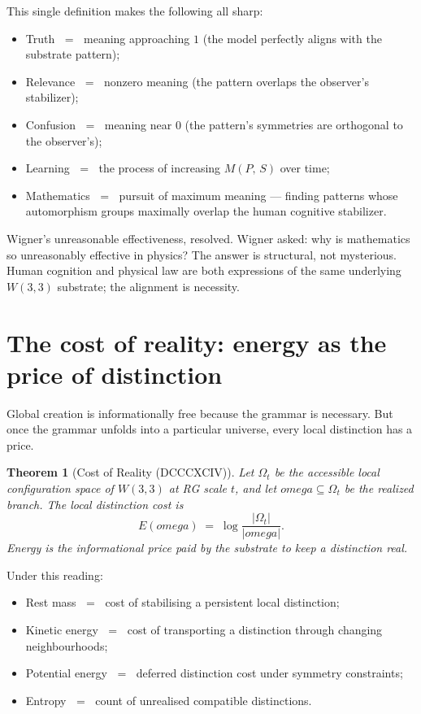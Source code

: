 \documentclass[11pt]{article}
\def\mathcal#1{#1}%
\def\textbf#1{#1}%
\def\omega{omega}%
\newtheorem*{theorem}{Theorem}
\begin{document}
This single definition makes the following all sharp:

\begin{itemize}[leftmargin=2em]
\item \textbf{Truth} $\;=\;$ meaning approaching $1$ (the model perfectly aligns with the substrate pattern);
\item \textbf{Relevance} $\;=\;$ nonzero meaning (the pattern overlaps the observer's stabilizer);
\item \textbf{Confusion} $\;=\;$ meaning near $0$ (the pattern's symmetries are orthogonal to the observer's);
\item \textbf{Learning} $\;=\;$ the process of increasing $\mathcal{M}(P,\,S)$ over time;
\item \textbf{Mathematics} $\;=\;$ pursuit of maximum meaning --- finding patterns whose automorphism groups maximally overlap the human cognitive stabilizer.
\end{itemize}

\textbf{Wigner's unreasonable effectiveness, resolved.} Wigner asked: why is mathematics so unreasonably effective in physics? The answer is structural, not mysterious. Human cognition and physical law are both expressions of the same underlying $W(3,3)$ substrate; the alignment is necessity.

\section{The cost of reality: energy as the price of distinction}

\label{sec:cost-of-reality}

Global creation is informationally free because the grammar is necessary. But once the grammar unfolds into a particular universe, every local distinction has a price.

\begin{theorem}[Cost of Reality (DCCCXCIV)]
Let $\Omega_t$ be the accessible local configuration space of $W(3,3)$ at RG scale $t$, and let $\omega \subseteq \Omega_t$ be the realized branch. The local distinction cost is
\[
\mathcal{E}(\omega) \;=\; \log \frac{|\Omega_t|}{|\omega|}.
\]
Energy is the informational price paid by the substrate to keep a distinction real.
\end{theorem}

Under this reading:
\begin{itemize}[leftmargin=2em]
\item \textbf{Rest mass} $\;=\;$ cost of stabilising a persistent local distinction;
\item \textbf{Kinetic energy} $\;=\;$ cost of transporting a distinction through changing neighbourhoods;
\item \textbf{Potential energy} $\;=\;$ deferred distinction cost under symmetry constraints;
\item \textbf{Entropy} $\;=\;$ count of unrealised compatible distinctions.
\end{itemize}
\end{document}
